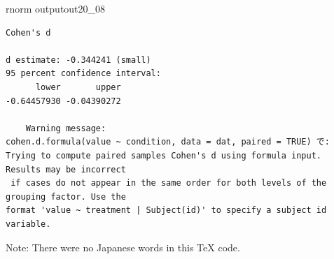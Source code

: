 \begin{Rscreen}{rnorm output}{out20_08}
	\begin{verbatim}
Cohen's d

d estimate: -0.344241 (small)
95 percent confidence interval:
      lower       upper 
-0.64457930 -0.04390272 

    Warning message: 
cohen.d.formula(value ~ condition, data = dat, paired = TRUE) で: 
Trying to compute paired samples Cohen's d using formula input. Results may be incorrect
 if cases do not appear in the same order for both levels of the grouping factor. Use the
format 'value ~ treatment | Subject(id)' to specify a subject id variable.
\end{verbatim}
\end{Rscreen}

Note: There were no Japanese words in this TeX code.
